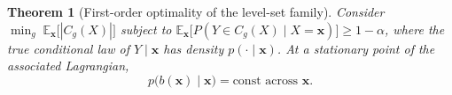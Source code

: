 \documentclass[10pt,twocolumn,a4paper]{article}
\newtheorem{theorem}{Theorem}
\begin{document}
\begin{theorem}[First-order optimality of the level-set family]
\label{thm:optimality}
Consider $\min_g \; \mathbb E_{\bm x}\big[|C_g(X)|\big]$ subject to
$\mathbb E_{\bm x}\big[P(Y\in C_g(X)\mid X=\bm x)\big] \ge 1-\alpha$, where the true conditional law
of $Y\mid \bm x$ has density $p(\cdot\mid\bm x)$. At a stationary point of the associated Lagrangian,
\begin{equation}
p\big(b(\bm x)\mid \bm x\big) = \text{const across } \bm x.
\label{eq:optcond}
\end{equation}
\end{theorem}
\end{document}
